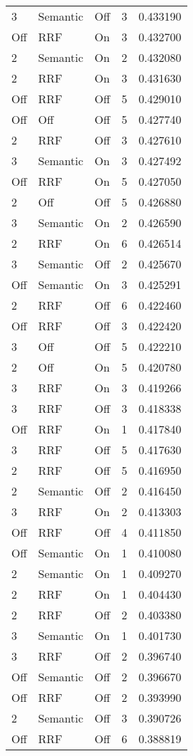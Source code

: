 \begin{tabular}{llllr}
3 & Semantic & Off & 3 & 0.433190 \\
Off & RRF & On & 3 & 0.432700 \\
2 & Semantic & On & 2 & 0.432080 \\
2 & RRF & On & 3 & 0.431630 \\
Off & RRF & Off & 5 & 0.429010 \\
Off & Off & Off & 5 & 0.427740 \\
2 & RRF & Off & 3 & 0.427610 \\
3 & Semantic & On & 3 & 0.427492 \\
Off & RRF & On & 5 & 0.427050 \\
2 & Off & Off & 5 & 0.426880 \\
3 & Semantic & On & 2 & 0.426590 \\
2 & RRF & On & 6 & 0.426514 \\
3 & Semantic & Off & 2 & 0.425670 \\
Off & Semantic & On & 3 & 0.425291 \\
2 & RRF & Off & 6 & 0.422460 \\
Off & RRF & Off & 3 & 0.422420 \\
3 & Off & Off & 5 & 0.422210 \\
2 & Off & On & 5 & 0.420780 \\
3 & RRF & On & 3 & 0.419266 \\
3 & RRF & Off & 3 & 0.418338 \\
Off & RRF & On & 1 & 0.417840 \\
3 & RRF & Off & 5 & 0.417630 \\
2 & RRF & Off & 5 & 0.416950 \\
2 & Semantic & Off & 2 & 0.416450 \\
3 & RRF & On & 2 & 0.413303 \\
Off & RRF & Off & 4 & 0.411850 \\
Off & Semantic & On & 1 & 0.410080 \\
2 & Semantic & On & 1 & 0.409270 \\
2 & RRF & On & 1 & 0.404430 \\
2 & RRF & Off & 2 & 0.403380 \\
3 & Semantic & On & 1 & 0.401730 \\
3 & RRF & Off & 2 & 0.396740 \\
Off & Semantic & Off & 2 & 0.396670 \\
Off & RRF & Off & 2 & 0.393990 \\
2 & Semantic & Off & 3 & 0.390726 \\
Off & RRF & Off & 6 & 0.388819 \\

\end{tabular}
